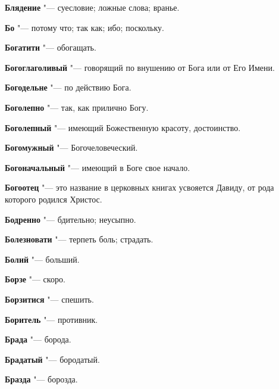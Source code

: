 \begin{mymulticols}{2}
\noindent\textbf{Блядение} "--- суесловие; ложные слова; вранье. 




\noindent\textbf{Бо} "--- потому что; так как; ибо; поскольку. 




\noindent\textbf{Богатити} "--- обогащать. 




\noindent\textbf{Богоглаголивый} "--- говорящий по внушению от Бога или от Его Имени. 




\noindent\textbf{Богодельне} "--- по действию Бога. 




\noindent\textbf{Боголепно} "--- так, как прилично Богу. 




\noindent\textbf{Боголепный} "--- имеющий Божественную красоту, достоинство. 




\noindent\textbf{Богомужный} "--- Богочеловеческий. 




\noindent\textbf{Богоначальный} "--- имеющий в Боге свое начало. 




\noindent\textbf{Богоотец} "--- это название в церковных книгах усвояется Давиду, от рода которого родился Христос. 




\noindent\textbf{Бодренно} "--- бдительно; неусыпно. 




\noindent\textbf{Болезновати} "--- терпеть боль; страдать. 




\noindent\textbf{Болий} "--- больший. 




\noindent\textbf{Борзе} "--- скоро. 




\noindent\textbf{Борзитися} "--- спешить. 




\noindent\textbf{Боритель} "--- противник. 




\noindent\textbf{Брада} "--- борода. 




\noindent\textbf{Брадатый} "--- бородатый. 




\noindent\textbf{Бразда} "--- борозда. 





\end{mymulticols}
